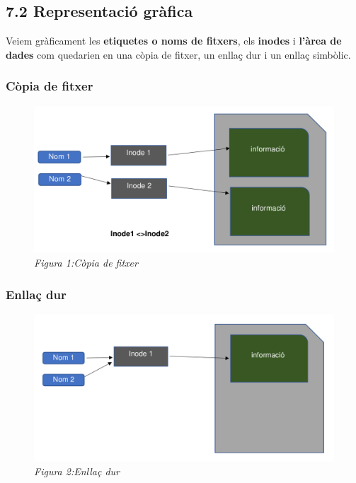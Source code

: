\documentclass[
  12 pt,
  a4paper,
]{article}
\begin{document}
\subsection{7.2 Representació
gràfica}\label{representaciuxf3-gruxe0fica}

Veiem gràficament les \textbf{etiquetes o noms de fitxers}, els
\textbf{inodes} i \textbf{l'àrea de dades} com quedarien en una còpia de
fitxer, un enllaç dur i un enllaç simbòlic.

\subsubsection{Còpia de fitxer}\label{cuxf2pia-de-fitxer}

\begin{figure}
\centering
\includegraphics{png/copiadeFitxer.png}
\caption{\emph{Figura 1:Còpia de fitxer}}
\end{figure}

\subsubsection{Enllaç dur}\label{enllauxe7-dur}

\begin{figure}
\centering
\includegraphics{png/enllaçDur.png}
\caption{\emph{Figura 2:Enllaç dur}}
\end{figure}
\end{document}

